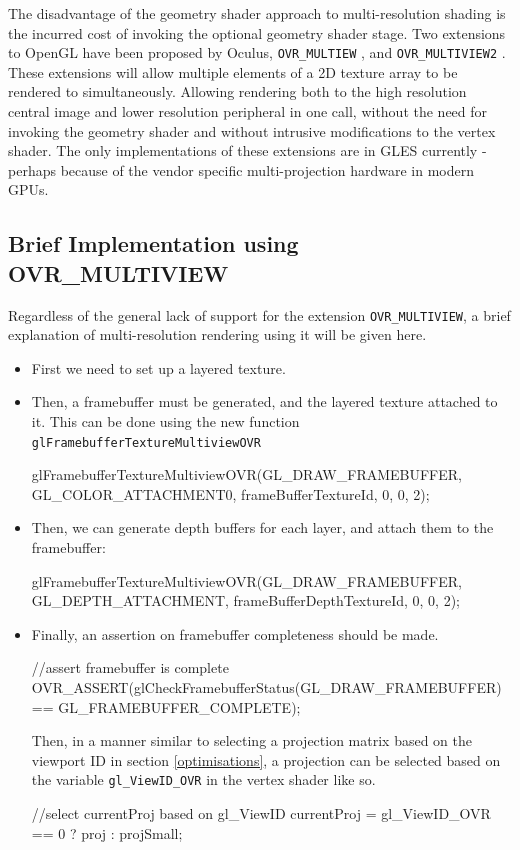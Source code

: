 \documentclass[12pt,a4paper,twoside,openright]{report}
\begin{document}
The disadvantage of the geometry shader approach to multi-resolution shading is the incurred cost of invoking the optional geometry shader stage.
Two extensions to OpenGL have been proposed by Oculus, \texttt{OVR\_MULTIEW} \cite{OVRmultiview}, and \texttt{OVR\_MULTIVIEW2} \cite{OVRmultiview2}. These extensions will allow multiple elements of a 2D texture array to be rendered to simultaneously. Allowing rendering both to the high resolution central image and lower resolution peripheral in one call, without the need for invoking the geometry shader and without intrusive modifications to the vertex shader. The only implementations of these extensions are in GLES currently - perhaps because of the vendor specific multi-projection hardware in modern GPUs.

\subsection{Brief Implementation using OVR\_MULTIVIEW}
Regardless of the general lack of support for the extension \texttt{OVR\_MULTIVIEW}, a brief explanation of multi-resolution rendering using it will be given here.

\begin{itemize}
\item First we need to set up a layered texture.

\item Then, a framebuffer must be generated, and the layered texture attached to it. This can be done using the new function \texttt{glFramebufferTextureMultiviewOVR}
\begin{footcode}
glFramebufferTextureMultiviewOVR(GL_DRAW_FRAMEBUFFER, GL_COLOR_ATTACHMENT0,
				 frameBufferTextureId, 0, 0, 2);
\end{footcode}
\item Then, we can generate depth buffers for each layer, and attach them to the framebuffer:
\begin{footcode}
glFramebufferTextureMultiviewOVR(GL_DRAW_FRAMEBUFFER, GL_DEPTH_ATTACHMENT,
				 frameBufferDepthTextureId, 0, 0, 2);
\end{footcode}
\item Finally, an assertion on framebuffer completeness should be made.
\begin{footcode}
//assert framebuffer is complete
OVR_ASSERT(glCheckFramebufferStatus(GL_DRAW_FRAMEBUFFER) == GL_FRAMEBUFFER_COMPLETE);
\end{footcode}

Then, in a manner similar to selecting a projection matrix based on the viewport ID in section \ref{optimisations}, a projection can be selected based on the variable \texttt{gl\_ViewID\_OVR} in the vertex shader like so.

\begin{footcode}
//select currentProj based on gl_ViewID 
currentProj = gl_ViewID_OVR == 0 ? proj : projSmall;
\end{footcode}

\end{itemize}
\end{document}
